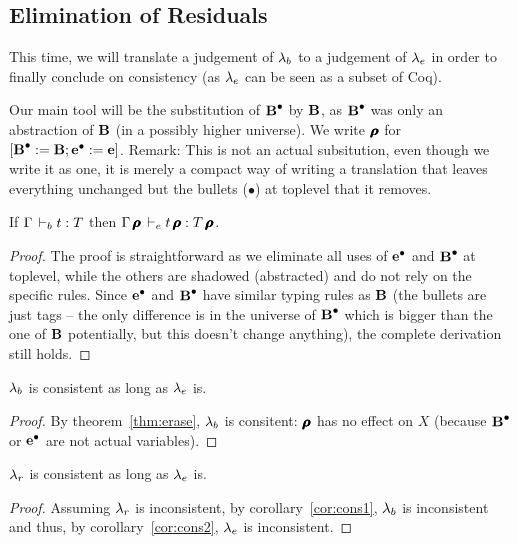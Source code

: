 \documentclass[a4paper,english]{lipics-utf8x}
\begin{document}
  \subsection{Elimination of Residuals}

  This time, we will translate a judgement of $\Sb$ to a judgement of $\Se$
  in order to finally conclude on consistency (as $\Se$ can be seen as a subset
  of Coq).

  Our main tool will be the substitution of $\operatorname{\operatorname{\mathbf{B}}^\bullet}$ by $\operatorname{\mathbf{B}}$, as $\operatorname{\operatorname{\mathbf{B}}^\bullet}$ was only
  an abstraction of $\operatorname{\mathbf{B}}$ (in a possibly higher universe).
  We write $\operatorname{\pmb{\bm{\rho}}}$ for $[\operatorname{\operatorname{\mathbf{B}}^\bullet} := \operatorname{\mathbf{B}} ; \operatorname{\operatorname{\mathbf{e}}^\bullet} := \operatorname{\mathbf{e}}]$.
  Remark: This is not an actual subsitution, even though we write it as one,
  it is merely a compact way of writing a translation that leaves everything
  unchanged but the bullets ($\bullet$) at toplevel that it removes.

  \begin{theorem}[Erasure ($\Sb$ to $\Se$)]
    \label{thm:erase}
    If $\Gamma \,\vdash_b t : T$ then $\Gamma\operatorname{\pmb{\bm{\rho}}} \,\vdash_e t\operatorname{\pmb{\bm{\rho}}} : T\operatorname{\pmb{\bm{\rho}}}$.
  \end{theorem}

  \begin{proof}
    The proof is straightforward as we eliminate all uses of $\operatorname{\operatorname{\mathbf{e}}^\bullet}$ and $\operatorname{\operatorname{\mathbf{B}}^\bullet}$
    at toplevel, while the others are shadowed (abstracted) and do not rely
    on the specific rules. Since $\operatorname{\operatorname{\mathbf{e}}^\bullet}$ and $\operatorname{\operatorname{\mathbf{B}}^\bullet}$ have similar typing rules
    as $\operatorname{\mathbf{B}}$ (the bullets are just tags -- the only difference is in the
    universe of $\operatorname{\operatorname{\mathbf{B}}^\bullet}$ which is bigger than the one of $\operatorname{\mathbf{B}}$ potentially,
    but this doesn't change anything), the complete derivation still holds.
  \end{proof}

  \begin{corollary}[Consistency of $\Sb$]
    \label{cor:cons2}
    $\Sb$ is consistent as long as $\Se$ is.
  \end{corollary}

  \begin{proof}
    By theorem~\ref{thm:erase}, $\Sb$ is consitent: $\operatorname{\pmb{\bm{\rho}}}$ has no effect on
    $X$ (because $\operatorname{\operatorname{\mathbf{B}}^\bullet}$ or $\operatorname{\operatorname{\mathbf{e}}^\bullet}$ are not actual variables).
  \end{proof}

  \begin{corollary}[Consitency]
    $\lambda_r$ is consistent as long as $\Se$ is.
  \end{corollary}

  \begin{proof}
    Assuming $\lambda_r$ is inconsistent, by corollary~\ref{cor:cons1},
    $\Sb$ is inconsistent and thus, by corollary~\ref{cor:cons2},
    $\Se$ is inconsistent.
  \end{proof}
\end{document}
